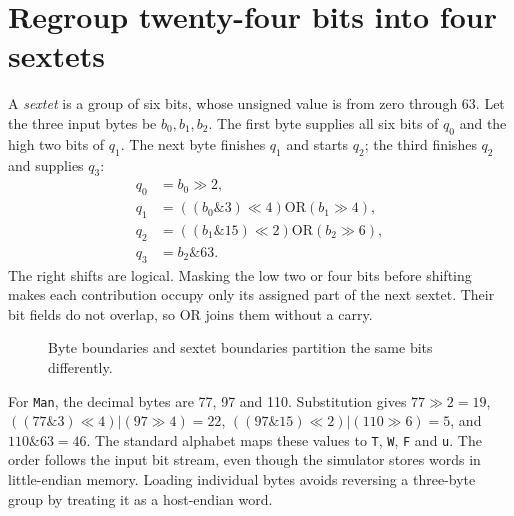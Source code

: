 \section{Regroup twenty-four bits into four sextets}
A \emph{sextet} is a group of six bits, whose unsigned value is from zero through 63.
Let the three input bytes be \(b_0,b_1,b_2\). The first byte supplies all six bits of
\(q_0\) and the high two bits of \(q_1\). The next byte finishes \(q_1\) and starts
\(q_2\); the third finishes \(q_2\) and supplies \(q_3\):
\[
\begin{aligned}
q_0&=b_0\gg2,\\
q_1&=((b_0\mathbin{\&}3)\ll4)\mathbin{\mathrm{OR}}(b_1\gg4),\\
q_2&=((b_1\mathbin{\&}15)\ll2)\mathbin{\mathrm{OR}}(b_2\gg6),\\
q_3&=b_2\mathbin{\&}63.
\end{aligned}
\]
The right shifts are logical. Masking the low two or four bits before shifting makes
each contribution occupy only its assigned part of the next sextet. Their bit fields
do not overlap, so OR joins them without a carry.

\begin{figure}[htbp]
\centering
{}
\caption{Byte boundaries and sextet boundaries partition the same bits differently.}\label{base64-bit-split}
\end{figure}

For \texttt{Man}, the decimal bytes are 77, 97 and 110. Substitution gives
\(77\gg2=19\), \(((77\mathbin{\&}3)\ll4)|(97\gg4)=22\),
\(((97\mathbin{\&}15)\ll2)|(110\gg6)=5\), and \(110\mathbin{\&}63=46\).
The standard alphabet maps these values to \texttt{T}, \texttt{W}, \texttt{F} and
\texttt{u}. The order follows the input bit stream, even though the simulator stores
words in little-endian memory. Loading individual bytes avoids reversing a three-byte
group by treating it as a host-endian word.
